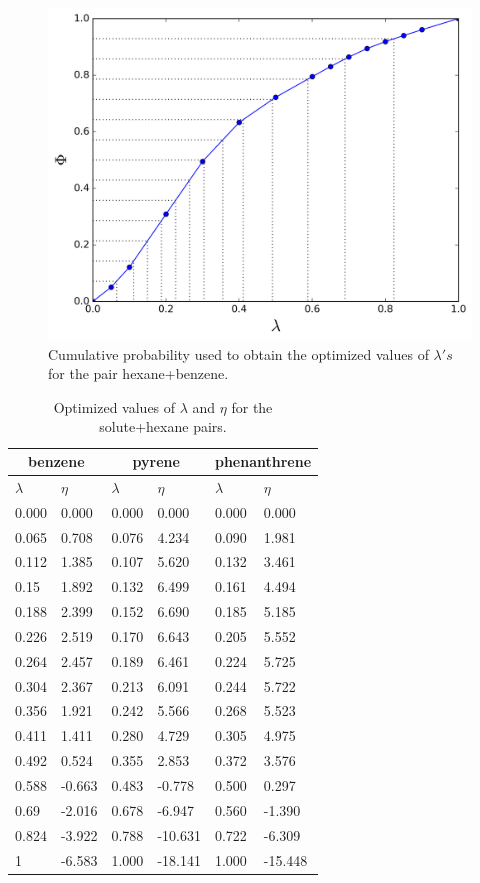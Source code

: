 \begin{figure}[h]
\centering
\includegraphics[width=0.8\linewidth]{Figures/optimized_cdf}
\caption{Cumulative probability used to obtain the optimized values of $\lambda 's$ for the pair hexane+benzene.}
\label{fig:optimized_cdf}
\end{figure}
\begin{table}[h]
	\centering
	\caption{Optimized values of $\lambda $ and $\eta $ for the solute+hexane pairs.}
	\label{tbl:lambdahex}
	\begin{tabular}{llllll}
		\hline\hline
		\multicolumn{2}{c}{benzene}&\multicolumn{2}{c}{pyrene}& \multicolumn{2}{c}{phenanthrene}\\
		\hline\hline
		$\lambda$ & $\eta$& $\lambda$ & $\eta$  & $\lambda$ & $\eta$   \\ 
		\hline\hline
		0.000     &0.000      & 0.000	&	0.000	&	0.000	&	0.000	\\
		0.065     &0.708  & 0.076	&	4.234	&	0.090	&	1.981	\\
		0.112     &1.385  & 0.107	&	5.620	&	0.132	&	3.461	\\
		0.15      &1.892  & 0.132	&	6.499	&	0.161	&	4.494	\\
		0.188     &2.399  & 0.152	&	6.690	&	0.185	&	5.185	\\
		0.226     &2.519  & 0.170	&	6.643	&	0.205	&	5.552	\\
		0.264     &2.457  & 0.189	&	6.461	&	0.224	&	5.725	\\
		0.304     &2.367  & 0.213	&	6.091	&	0.244	&	5.722	\\
		0.356     &1.921  & 0.242	&	5.566	&	0.268	&	5.523	\\
		0.411     &1.411  & 0.280	&	4.729	&	0.305	&	4.975	\\
		0.492     &0.524  & 0.355	&	2.853	&	0.372	&	3.576	\\
		0.588     &-0.663 & 0.483	&	-0.778	&	0.500	&	0.297	\\
		0.69      &-2.016 & 0.678	&	-6.947	&	0.560	&	-1.390	\\
		0.824     &-3.922 & 0.788	&	-10.631	&	0.722	&	-6.309	\\
		1         &-6.583  &1.000	  &	-18.141	&	1.000	&	-15.448	\\
		\hline\hline   
	\end{tabular}
\end{table}
